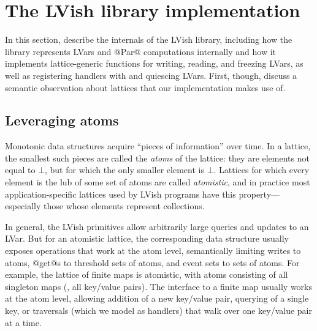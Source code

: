 \section{The LVish library implementation}\label{s:lvish-internals}


In this section,  describe the internals of the LVish library,
including how the library represents LVars and @Par@ computations
internally and how it implements lattice-generic functions for
writing, reading, and freezing LVars, as well as registering handlers
with and quiescing LVars.  First, though,  discuss a semantic
observation about lattices that our implementation makes use of.

\subsection{Leveraging atoms}\label{subsection:lvish-leveraging-atoms}

Monotonic data structures acquire ``pieces of information'' over time.
In a lattice, the smallest such pieces are called the \emph{atoms} of
the lattice: they are elements not equal to $\bot$, but for which the
only smaller element is $\bot$.  Lattices for which every element is
the lub of some set of atoms are called \emph{atomistic}, and in
practice most application-specific lattices used by LVish programs
have this property---especially those whose elements represent
collections.

In general, the LVish primitives allow arbitrarily large queries and
updates to an LVar.  But for an atomistic lattice, the corresponding
data structure usually exposes operations that work at the atom level,
semantically limiting writes to atoms, @get@s to threshold sets of
atoms, and event sets to sets of atoms.  For example, the lattice of
finite maps is atomistic, with atoms consisting of all singleton maps
(\ie, all key/value pairs).  The interface to a finite map usually
works at the atom level, allowing addition of a new key/value pair,
querying of a single key, or traversals (which we model as handlers)
that walk over one key/value pair at a time.

